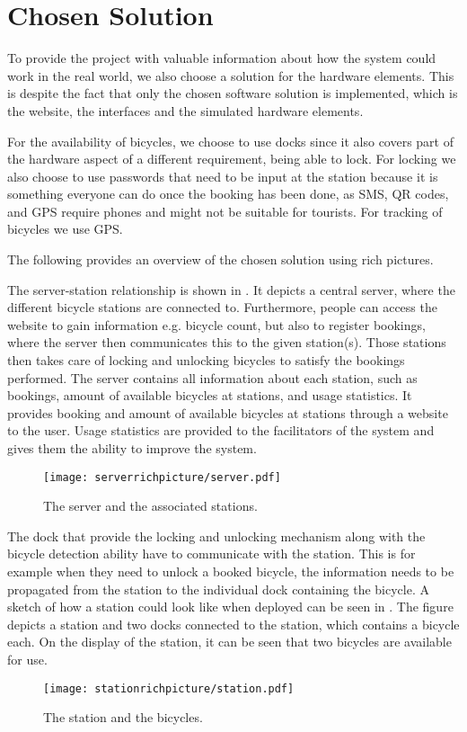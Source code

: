 \section{Chosen Solution}
To provide the project with valuable information about how the system could work in the real world, we also choose a solution for the hardware elements.
This is despite the fact that only the chosen software solution is implemented, which is the website, the interfaces and the simulated hardware elements.

For the availability of bicycles, we choose to use docks since it also covers part of the hardware aspect of a different requirement, being able to lock.  
For locking we also choose to use passwords that need to be input at the station because it is something everyone can do once the booking has been done, as SMS, QR codes, and GPS require phones and might not be suitable for tourists.
For tracking of bicycles we use GPS.

The following provides an overview of the chosen solution using rich pictures.

The server-station relationship is shown in .
It depicts a central server, where the different bicycle stations are connected to.
Furthermore, people can access the website to gain information e.g. bicycle count, but also to register bookings, where the server then communicates this to the given station(s).
Those stations then takes care of locking and unlocking bicycles to satisfy the bookings performed.
The server contains all information about each station, such as bookings, amount of available bicycles at stations, and usage statistics.
It provides booking and amount of available bicycles at stations through a website to the user. 
Usage statistics are provided to the facilitators of the system and gives them the ability to improve the system. 

\begin{figure}[h]
\centering
\texttt{[image: serverrichpicture/server.pdf]}
\caption{The server and the associated stations.}
\label{fig:ServerRichPicture}
\end{figure}

The dock that provide the locking and unlocking mechanism along with the bicycle detection ability have to communicate with the station. 
This is for example when they need to unlock a booked bicycle, the information needs to be propagated from the station to the individual dock containing the bicycle.
A sketch of how a station could look like when deployed can be seen in .
The figure depicts a station and two docks connected to the station, which contains a bicycle each. 
On the display of the station, it can be seen that two bicycles are available for use.
\begin{figure}[h]
\centering
\texttt{[image: stationrichpicture/station.pdf]}
\caption{The station and the bicycles.}
\label{fig:StationRichPicture}
\end{figure}